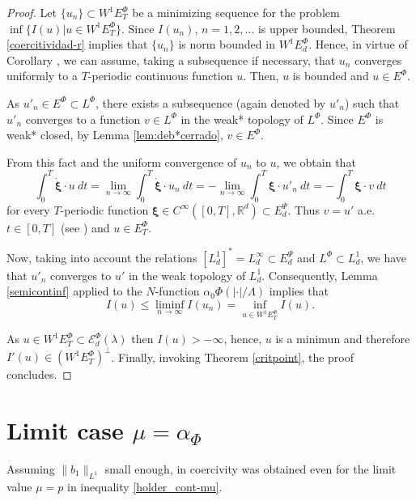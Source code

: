 \documentclass[twoside]{article}
\theoremstyle{remark}
\newcommand{\lphi}{L^{\Phi}}
\newcommand{\ephi}{E^{\Phi}}
\newcommand{\wphiet}{W^{1}\ephi_T}
\newcommand{\wphie}{W^{1}\ephi}
\newcommand{\domi}{\mathcal{E}^{\Phi}_d(\lambda)}
\renewcommand{\b}[1]{\boldsymbol{#1}}
\newcommand{\rr}{\mathbb{R}}
\newcommand{\ccdot}{\b{\cdot}}
\renewcommand{\leq}{\leqslant}
\newcommand{\epsi}{E^{\Psi}}
\begin{document}
\begin{proof}



Let $\{u_n\}\subset \wphiet$  be a  minimizing sequence for the problem  $\inf\{I(u)|u\in\wphiet\}$.
Since  $I(u_n)$, $n=1,2,\ldots$  is upper bounded, Theorem \ref{coercitividad-r}  implies that $\{u_n\}$ is norm bounded in $\wphie_d$. Hence, in virtue of Corollary \cite[Corollary 2.2]{ABGMS2015}, we can assume, taking a subsequence if necessary, that $u_n$ converges uniformly to a $T$-periodic continuous function $u$.
Then, $u$ is bounded and $u \in \ephi$.

As $u'_n \in \ephi\subset \lphi$,
there exists a subsequence (again denoted by $u'_n$) such that $u'_n$ converges to a function $v\in\lphi$ in the weak* topology of $\lphi$.
Since $\ephi$ is weak* closed, by Lemma \ref{lem:deb*cerrado}, $v\in \ephi$.

From this fact and the uniform convergence of $u_n$ to $u$, we obtain that
\[
\int_0^T\b{\dot{\xi}}\cdot u\ dt=\lim_{n\to\infty}\int_0^T\b{\dot{\xi}}\cdot u_n \ dt=-\lim_{n\to\infty}\int_0^T\b{\xi}\cdot u'_n\ dt=-\int_0^T\b{\xi}\cdot v\ dt
\]
for every $T$-periodic function $\b{\xi}\in C^{\infty}([0,T],\rr^d)\subset\epsi_d$.
Thus $v=u'$ a.e. $t\in [0,T]$ (see \cite[p. 6]{mawhin2010critical}) and $u\in\ephi_T$.

Now, taking into account the relations $\left[L^1_d\right]^*=L^{\infty}_d\subset  \epsi_d$ and $\lphi\subset L^1_d$, we have that $u'_n$ converges to $u'$ in the weak topology of $L^1_d$. Consequently,  Lemma \ref{semicontinf} applied to the $N$-function $\alpha_0\Phi\left(|\ccdot|/\Lambda\right)$ implies that
\[I(u)\leq  \liminf_{n\to\infty}I(u_n)=\inf\limits_{u\in\wphie_T}I(u).\]

As $u\in \wphiet\subset \domi$ then $I(u)>-\infty$, hence, $u$ is a minimun and therefore  $I'(u)\in (\wphiet)^{\perp}$. Finally,
invoking Theorem \ref{critpoint},  the proof concludes.\end{proof}



 \section{Limit case $\mu=\alpha_{\Phi}$}
Assuming $\|b_1\|_{L^1}$  small enough, in  \cite{zhao2004periodic, tang2010periodic} 
coercivity  was obtained even  for the limit value $\mu=p$ in inequality \eqref{holder_cont-mu}.  
\end{document}
